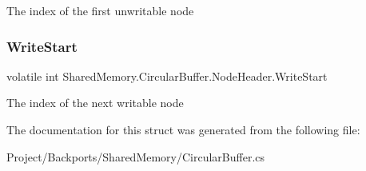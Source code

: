 The index of the first unwritable node 

\mbox{\label{struct_shared_memory_1_1_circular_buffer_1_1_node_header_a7fc8c2c6403cba9549ca7673a393b1b4}} 
\subsubsection{\texorpdfstring{Write\+Start}{WriteStart}}
{\footnotesize\ttfamily volatile int Shared\+Memory.\+Circular\+Buffer.\+Node\+Header.\+Write\+Start}



The index of the next writable node 



The documentation for this struct was generated from the following file\+:\begin{DoxyCompactItemize}
\item 
Project/\+Backports/\+Shared\+Memory/Circular\+Buffer.\+cs\end{DoxyCompactItemize}
